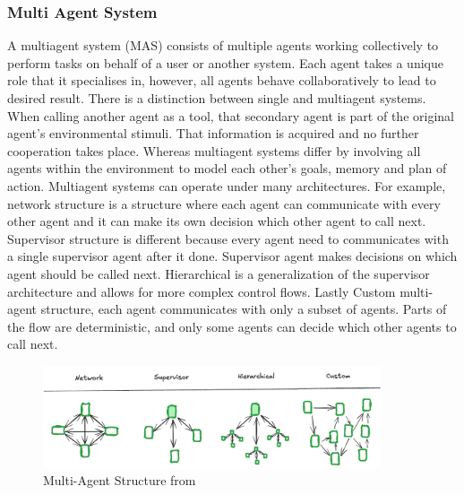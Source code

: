         \subsubsection{Multi Agent System}
        A multiagent system (MAS) consists of multiple agents working collectively to perform tasks on behalf of a user or another system. Each agent takes a unique role that it specialises in, however, all agents behave collaboratively to lead to desired result. There is a distinction between single and multiagent systems. When calling another agent as a tool, that secondary agent is part of the original agent's environmental stimuli. That information is acquired and no further cooperation takes place. Whereas multiagent systems differ by involving all agents within the environment to model each other's goals, memory and plan of action. Multiagent systems can operate under many architectures. For example, network structure is a structure where each agent can communicate with every other agent and it can make its own decision which other agent to call next. Supervisor structure is different because every agent need to communicates with a single supervisor agent after it done. Supervisor agent makes decisions on which agent should be called next. Hierarchical is a generalization of the supervisor architecture and allows for more complex control flows. Lastly Custom multi-agent structure, each agent communicates with only a subset of agents. Parts of the flow are deterministic, and only some agents can decide which other agents to call next.
        \cite{Gutowska} \cite{LangGraph}
        \begin{figure}[H]
            \centering
            \includegraphics[width=10cm]{chapters/2/figures/multi-agent.png}
            \caption[Multi-Agent Structure]{Multi-Agent Structure  from~\cite{LangGraph}}
            \label{fig:multi-agent}
        \end{figure}


